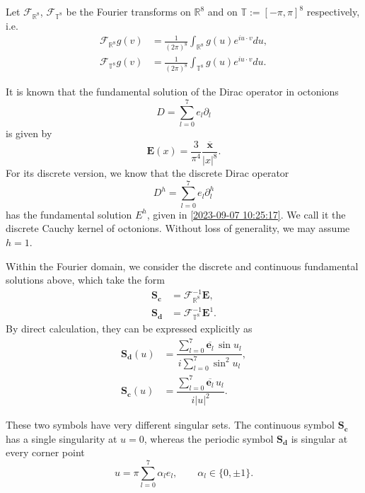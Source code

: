 \documentclass{amsart}
\theoremstyle{definition}
\theoremstyle{remark}
\numberwithin{equation}{section}
\newcommand{\R}{\mathbb{R}}
\newcommand{\e}{\bm{e}}
\newcommand{\E}{\bm{E}}
\begin{document}
Let $\mathcal F_{\R^8}$, $\mathcal F_{\mathbb T^8}$ be the Fourier transforms on $\R^8$ and on $\mathbb T:=[-\pi,\pi]^8$ respectively, i.e. \begin{equation*}
    \begin{aligned}
        \mathcal F_{\R^8} g (v)&=\frac{1}{(2\pi)^8}\int_{\R^8} g(u)e^{iu\cdot v} du,\\
        \mathcal F_{\mathbb T^8} g (v)&=\frac{1}{(2\pi)^8}\int_{\mathbb T^8} g(u)e^{iu\cdot v} du.
    \end{aligned}
\end{equation*}






It is known that the fundamental solution of the Dirac operator in octonions
\[
D=\sum_{l=0}^7 e_l\partial_l
\]
is given by
 \[
\E(x) = \dfrac{3}{\pi^4} \dfrac{\bm {\overline x}}{|x|^8}.
\]
For its discrete version, we know that the discrete Dirac operator
\[
D^h=\sum_{l=0}^7 e_l\partial_l^h
\]
has the fundamental solution $E^h$, given in  \eqref{2023-09-07 10:25:17}. We call it the discrete Cauchy kernel of octonions.
Without loss of generality, we may assume $h=1$.










Within the Fourier domain, we consider   the discrete and continuous fundamental solutions above, which  take the form
\begin{equation}
	\label{2023-10-02 15:12:13}
	\begin{aligned}
	 \bm{S_c}	 & = \mathcal{F}_{\R^8}^{-1} \E, \\
	\bm{S_d}	& = \mathcal{F}_{\mathbb T^8}^{-1}  \E^1.
	\end{aligned}
\end{equation}
By direct calculation, they can be expressed explicitly as
\[ \begin{split}
	\bm{S_d}(u) & = \dfrac{\sum_{l=0}^7 \overline{\e_l} \, \sin u_l}{i\sum_{l=0}^7 \sin^2 u_l}, \\
	\bm{S_c}(u) & = \dfrac{\sum_{l=0}^7 \overline{\e_l} \, u_l}{i|u|^2}.
\end{split} \]


These two symbols have very different singular sets. The continuous symbol \( \bm{S_c} \) has a single singularity at \(u=0\), whereas the periodic symbol \( \bm{S_d} \) is singular at every corner point
\[ u = \pi \sum_{l=0}^7 \alpha_l e_l, \qquad \alpha_l \in \{0,\pm 1\}. \]
\end{document}

